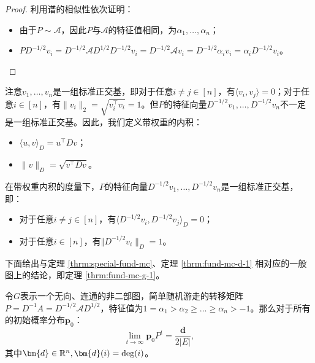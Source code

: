 \begin{proof}
    利用谱的相似性依次证明：
    \begin{itemize}
        \item 由于$P\sim \mathcal{A}$，因此$P$与$\mathcal{A}$的特征值相同，为$\alpha_1,\dots,\alpha_n$；
        \item $PD^{-1/2}v_i=D^{-1/2}\mathcal{A}D^{1/2}D^{-1/2}v_i=D^{-1/2}\mathcal{A}v_i=D^{-1/2}\alpha_iv_i=\alpha_iD^{-1/2}v_i$。
    \end{itemize}
\end{proof}

注意$v_1,\dots,v_n$是一组标准正交基，即对于任意$i\ne j\in[n]$，有$\langle v_i,v_j\rangle=0$；对于任意$i\in[n]$，有$\lVert v_i\rVert_2=\sqrt{v_i^{\top}v_i} =1$。但$P$的特征向量$D^{-1/2}v_1,\dots,D^{-1/2}v_n$不一定是一组标准正交基。因此，我们定义带权重的内积：
\begin{itemize}
    \item $\langle u,v\rangle_{D}=u^{\top}Dv$；
    \item $\lVert v\rVert_{D}=\sqrt{v^{\top}Dv}$。
\end{itemize}

在带权重内积的度量下，$P$的特征向量$D^{-1/2}v_1,\dots,D^{-1/2}v_n$是一组标准正交基，即：
\begin{itemize}
    \item 对于任意$i\ne j\in[n]$，有$\langle D^{-1/2}v_i,D^{-1/2}v_j\rangle_D=0$；
    \item 对于任意$i\in[n]$，有$\Vert D^{-1/2}v_i\rVert_D =1$。
\end{itemize}

\vspace{0.25cm}
下面给出与定理 \ref{thrm:special-fund-mc}、定理 \ref{thrm:fund-mc-d-1} 相对应的一般图上的结论，即定理 \ref{thrm:fund-mc-g-1}。
            
\begin{theorem}
    \label{thrm:fund-mc-g-1}
    令$G$表示一个无向、连通的非二部图，简单随机游走的转移矩阵$P=D^{-1}A=D^{-1/2}\mathcal{A}D^{1/2}$，特征值为$1=\alpha_1>\alpha_2\ge\dots \ge \alpha_n> -1$。那么对于所有的初始概率分布$\bm{p}_0$：
    \[
        \lim_{t \to \infty} \bm{p}_0P^t  = \frac{\bm{d}}{2|E|},
    \]
    其中$\bm{d}\in \mathbb{R}^n,\bm{d}(i)=\textup{deg}(i)$。
\end{theorem}
                

